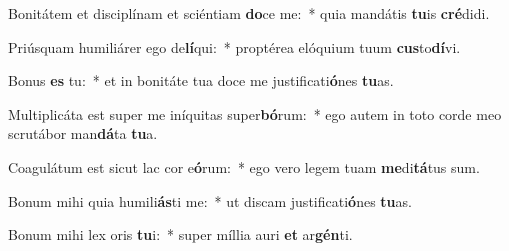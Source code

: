 \item Bonitátem et disciplínam et sciéntiam \textbf{do}ce me:~* quia mandátis \textbf{tu}is \textbf{cré}didi.
\item Priúsquam humiliárer ego de\textbf{lí}qui:~* proptérea elóquium tuum \textbf{cus}to\textbf{dí}vi.
\item Bonus \textbf{es} tu:~* et in bonitáte tua doce me justificati\textbf{ó}nes \textbf{tu}as.
\item Multiplicáta est super me iníquitas super\textbf{bó}rum:~* ego autem in toto corde meo scrutábor man\textbf{dá}ta \textbf{tu}a.
\item Coagulátum est sicut lac cor e\textbf{ó}rum:~* ego vero legem tuam \textbf{me}di\textbf{tá}tus sum.
\item Bonum mihi quia humili\textbf{ás}ti me:~* ut discam justificati\textbf{ó}nes \textbf{tu}as.
\item Bonum mihi lex oris \textbf{tu}i:~* super míllia auri \textbf{et} ar\textbf{gén}ti.
